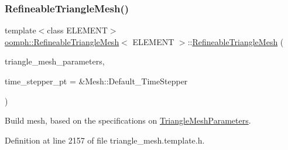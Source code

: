 \subsubsection{\texorpdfstring{Refineable\+Triangle\+Mesh()}{RefineableTriangleMesh()}\hspace{0.1cm}{\footnotesize\ttfamily [1/3]}}
{\footnotesize\ttfamily template$<$class E\+L\+E\+M\+E\+NT$>$ \\
\hyperlink{classoomph_1_1RefineableTriangleMesh}{oomph\+::\+Refineable\+Triangle\+Mesh}$<$ E\+L\+E\+M\+E\+NT $>$\+::\hyperlink{classoomph_1_1RefineableTriangleMesh}{Refineable\+Triangle\+Mesh} (\begin{DoxyParamCaption}\item[{\hyperlink{classoomph_1_1TriangleMeshParameters}{Triangle\+Mesh\+Parameters} \&}]{triangle\+\_\+mesh\+\_\+parameters,  }\item[{Time\+Stepper $\ast$}]{time\+\_\+stepper\+\_\+pt = {\ttfamily \&Mesh\+:\+:Default\+\_\+TimeStepper} }\end{DoxyParamCaption})\hspace{0.3cm}{\ttfamily [inline]}}



Build mesh, based on the specifications on \hyperlink{classoomph_1_1TriangleMeshParameters}{Triangle\+Mesh\+Parameters}. 



Definition at line 2157 of file triangle\+\_\+mesh.\+template.\+h.

\mbox{\label{classoomph_1_1RefineableTriangleMesh_a72c24c96f89006c905551b650db29cc7}} 
